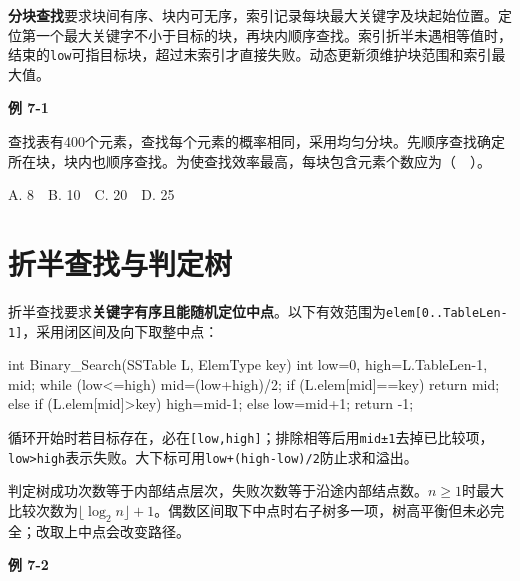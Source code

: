 \textbf{分块查找}要求块间有序、块内可无序，索引记录每块最大关键字及块起始位置。定位第一个最大关键字不小于目标的块，再块内顺序查找。索引折半未遇相等值时，结束的\texttt{low}可指目标块，超过末索引才直接失败。动态更新须维护块范围和索引最大值。

\par\medskip{}\noindent\hypertarget{DS07-E01}{}\label{DS07-E01}\textbf{例 7-1}\par\nobreak\smallskip

查找表有400个元素，查找每个元素的概率相同，采用均匀分块。先顺序查找确定所在块，块内也顺序查找。为使查找效率最高，每块包含元素个数应为（　）。

A. 8　B. 10　C. 20　D. 25

\section{折半查找与判定树}\label{DS07-binary}

折半查找要求\textbf{关键字有序且能随机定位中点}。以下有效范围为\texttt{elem[\allowbreak{}0.\allowbreak{}.\allowbreak{}TableLen-1]\allowbreak{}}，采用闭区间及向下取整中点：

\par\smallskip\noindent\begin{minipage}{\linewidth}
\begin{codeblock}[language={C++}]
int Binary_Search(SSTable L, ElemType key) {
    int low=0, high=L.TableLen-1, mid;
    while (low<=high) {
        mid=(low+high)/2;
        if (L.elem[mid]==key) return mid;
        else if (L.elem[mid]>key) high=mid-1;
        else low=mid+1;
    }
    return -1;
}
\end{codeblock}
\end{minipage}\par\smallskip

循环开始时若目标存在，必在\texttt{[\allowbreak{}low,\allowbreak{}high]\allowbreak{}}；排除相等后用\texttt{mid±1}去掉已比较项，\texttt{low>\allowbreak{}high}表示失败。大下标可用\texttt{low+\allowbreak{}(\allowbreak{}high-low)\allowbreak{}/\allowbreak{}2}防止求和溢出。

判定树成功次数等于内部结点层次，失败次数等于沿途内部结点数。\(n\ge1\)时最大比较次数为\(\lfloor\log_2n\rfloor+1\)。偶数区间取下中点时右子树多一项，树高平衡但未必完全；改取上中点会改变路径。

\par\medskip{}\noindent\hypertarget{DS07-E02}{}\label{DS07-E02}\textbf{例 7-2}\par\nobreak\smallskip

